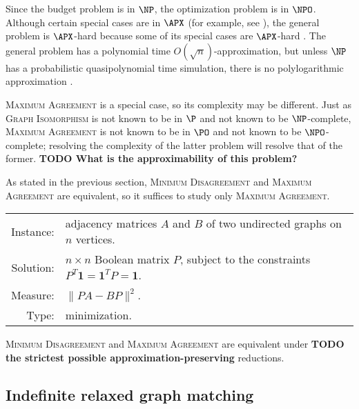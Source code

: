 \documentclass{article}
\newcommand{\todo}[1]{\textbf{TODO #1}}
\newcommand{\1}{\mathbf{1}}
\newcommand{\MD}{\textsc{Minimum Disagreement}}
\renewcommand{\MA}{\textsc{Maximum Agreement}}
\begin{document}
Since the budget problem is in $\NP$, the optimization problem is in $\NPO$.
Although certain special cases are in $\APX$ (for example, see \autocite{ahs01}), the general problem is $\APX$-hard because some of its special cases are $\APX$-hard \autocite{mms10}.
The general problem has a polynomial time $O(\sqrt{n})$-approximation, but unless $\NP$ has a probabilistic quasipolynomial time simulation, there is no polylogarithmic approximation \autocite{mms10}.

\MA{} is a special case, so its complexity may be different.
Just as \textsc{Graph Isomorphism} is not known to be in $\P$ and not known to be $\NP$-complete, \MA{} is not known to be in $\PO$ and not known to be $\NPO$-complete; resolving the complexity of the latter problem will resolve that of the former.
\todo{What is the approximability of this problem?}


As stated in the previous section, \MD{} and \MA{} are equivalent, so it suffices to study only \MA{}.

\begin{definition}[\MD]
  \mbox{}

  \begin{tabular}{r p{9.3cm}}
    Instance: & adjacency matrices $A$ and $B$ of two undirected graphs on $n$ vertices. \\
    Solution: & $n \times n$ Boolean matrix $P$, subject to the constraints $P^T \1 = \1^T P = \1$. \\
    Measure: & $\|PA - BP\|^2$. \\
    Type: & minimization.
  \end{tabular}
\end{definition}

\begin{theorem}
  \MD{} and \MA{} are equivalent under \todo{the strictest possible approximation-preserving} reductions.
\end{theorem}

\subsection{Indefinite relaxed graph matching}
\end{document}
